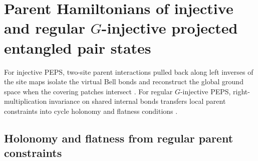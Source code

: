 \chapter{Parent Hamiltonians of injective and regular $G$-injective projected entangled pair states}%
\label{ch:peps_parent_hamiltonians}

For injective PEPS, two-site parent interactions pulled back along left inverses of the site maps isolate the virtual Bell bonds and reconstruct the global ground space when the covering patches intersect \cite[Section~IV.C.1]{Cirac2021Matrix}. For regular $G$-injective PEPS, right-multiplication invariance on shared internal bonds transfers local parent constraints into cycle holonomy and flatness conditions \cite[Section~5]{Schuch2010PEPS}.

















\section{Holonomy and flatness from regular parent constraints}%
\label{sec:peps_regular_parent_flatness}






